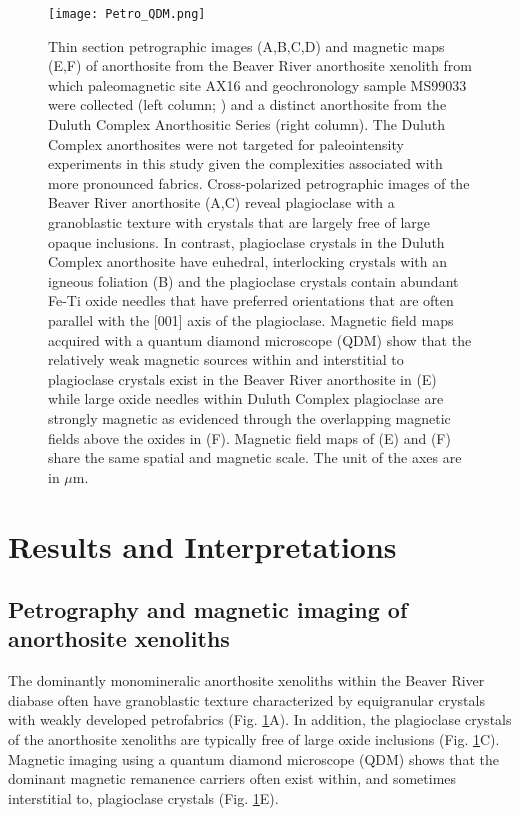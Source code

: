 \documentclass[9pt,twocolumn,twoside,lineno]{pnas-new}
\begin{document}
\begin{figure}
\centering
\noindent\texttt{[image: Petro\_QDM.png]}
\caption{\footnotesize{Thin section petrographic images (A,B,C,D) and magnetic maps (E,F) of anorthosite from the Beaver River anorthosite xenolith from which paleomagnetic site AX16 and geochronology sample MS99033 were collected (left column;  \citealp{Zhang2021b}) and a distinct anorthosite from the Duluth Complex Anorthositic Series (right column). The Duluth Complex anorthosites were not targeted for paleointensity experiments in this study given the complexities associated with more pronounced fabrics. Cross-polarized petrographic images of the Beaver River anorthosite (A,C) reveal plagioclase with a granoblastic texture with crystals that are largely free of large opaque inclusions. In contrast, plagioclase crystals in the Duluth Complex anorthosite have euhedral, interlocking crystals with an igneous foliation (B) and the plagioclase crystals contain abundant Fe-Ti oxide needles that have preferred orientations that are often parallel with the [001] axis of the plagioclase. Magnetic field maps acquired with a quantum diamond microscope (QDM) show that the relatively weak magnetic sources within and interstitial to plagioclase crystals exist in the Beaver River anorthosite in (E) while large oxide needles within Duluth Complex plagioclase are strongly magnetic as evidenced through the overlapping magnetic fields above the oxides in (F). Magnetic field maps of (E) and (F) share the same spatial and magnetic scale. The unit of the axes are in $\mu$m.}}
\label{fig:Petro_QDM}
\end{figure}

\section*{Results and Interpretations}

\subsection*{Petrography and magnetic imaging of anorthosite xenoliths}

The dominantly monomineralic anorthosite xenoliths within the Beaver River diabase often have granoblastic texture characterized by equigranular crystals with weakly developed petrofabrics (Fig. \ref{fig:Petro_QDM}A). In addition, the plagioclase crystals of the anorthosite xenoliths are typically free of large oxide inclusions (Fig. \ref{fig:Petro_QDM}C). Magnetic imaging using a quantum diamond microscope (QDM) shows that the dominant magnetic remanence carriers often exist within, and sometimes interstitial to, plagioclase crystals (Fig. \ref{fig:Petro_QDM}E). 
\end{document}
